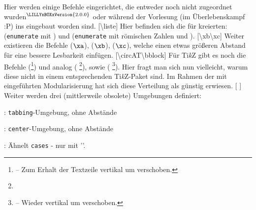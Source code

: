 Hier werden einige Befehle eingerichtet, die entweder noch nicht zugeordnet wurden\({}^{\tiny \LILLYxBOXxVersion{\tiny 2.0.0}}\) oder während der Vorlesung (im Überlebenskampf :P) ins  eingebaut worden sind.
%
%
%
[\cmdlist \textbackslash liste]
Hier befinden sich die für \la kreierten:  (\verb|enumerate| mit \newline{}) und  (\verb|enumerate| mit römischen Zahlen und \newline{}). \medskip\newline %
%
%
%
[\cmdlist \textbackslash xb\cmdlist \textbackslash xc]
Weiter existieren die Befehle  ($\xa$),  ($\xb$),  ($\xc$), welche einen etwas größeren Abstand für eine bessere Lesbarkeit einfügen. \medskip\newline
{}[\cmdlist \textbackslash circAT\cmdlist \textbackslash bblock]
Für Ti\textit{k}Z gibt es noch die Befehle  (\footnote{ -- Zum Erhalt der Textzeile vertikal um  verschoben.}) und analog\newline {} ( \footnote{}), sowie  ( \footnote{ -- Wieder vertikal um  verschoben.}). Hier fragt man sich nun vielleicht, warum diese nicht in einem entsprechenden Ti\textit{k}Z-Paket sind. Im Rahmen der mit  eingeführten Modularisierung hat sich diese Verteilung als günstig erwiesen. %
\newline
%
%
%
[\cmdlist {}\cmdlist {} \cmdold]
Weiter werden drei (mittlerweile obsolete) Umgebungen definiert: \begin{ditemize}\narrowitems
    \item {}:  \verb|tabbing|-Umgebung, ohne Abstände
    \item {}: \verb|center|-Umgebung, ohne Abstände
    \item {}: Ähnelt \verb|cases| - nur mit '\T{]}'.
\end{ditemize}
